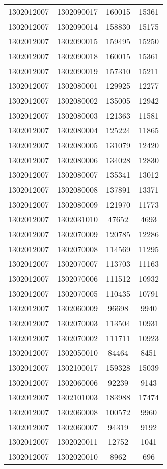 \begin{longtable}[h]{llcc}
		1302012007 & 1302090017 & 160015 & 15361\\
		1302012007 & 1302090014 & 158830 & 15175\\
		1302012007 & 1302090015 & 159495 & 15250\\
		1302012007 & 1302090018 & 160015 & 15361\\
		1302012007 & 1302090019 & 157310 & 15211\\
		1302012007 & 1302080001 & 129925 & 12277\\
		1302012007 & 1302080002 & 135005 & 12942\\
		1302012007 & 1302080003 & 121363 & 11581\\
		1302012007 & 1302080004 & 125224 & 11865\\
		1302012007 & 1302080005 & 131079 & 12420\\
		1302012007 & 1302080006 & 134028 & 12830\\
		1302012007 & 1302080007 & 135341 & 13012\\
		1302012007 & 1302080008 & 137891 & 13371\\
		1302012007 & 1302080009 & 121970 & 11773\\
		1302012007 & 1302031010 & 47652 & 4693\\
		1302012007 & 1302070009 & 120785 & 12286\\
		1302012007 & 1302070008 & 114569 & 11295\\
		1302012007 & 1302070007 & 113703 & 11163\\
		1302012007 & 1302070006 & 111512 & 10932\\
		1302012007 & 1302070005 & 110435 & 10791\\
		1302012007 & 1302060009 & 96698 & 9940\\
		1302012007 & 1302070003 & 113504 & 10931\\
		1302012007 & 1302070002 & 111711 & 10923\\
		1302012007 & 1302050010 & 84464 & 8451\\
		1302012007 & 1302100017 & 159328 & 15039\\
		1302012007 & 1302060006 & 92239 & 9143\\
		1302012007 & 1302101003 & 183988 & 17474\\
		1302012007 & 1302060008 & 100572 & 9960\\
		1302012007 & 1302060007 & 94319 & 9192\\
		1302012007 & 1302020011 & 12752 & 1041\\
		1302012007 & 1302020010 & 8962 & 696\\

\end{longtable}
